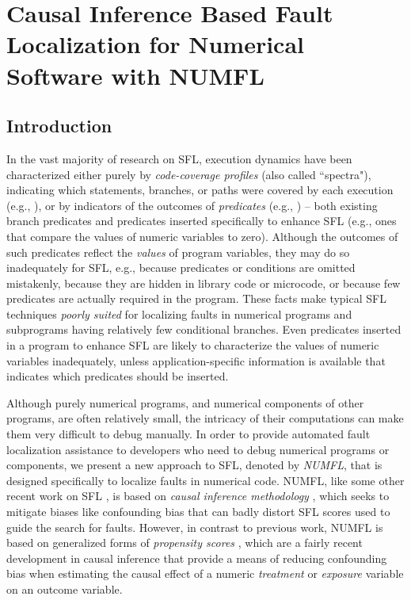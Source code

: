 \chapter{Causal Inference Based Fault Localization for Numerical Software with NUMFL}\label{chap:NUMFL}

\section{Introduction}\label{introduction}
\vspace{-2pt}

In the vast majority of research on SFL, execution dynamics have been characterized either purely by {\it code-coverage profiles} (also called ``spectra"), indicating which statements, branches, or paths were covered by each execution (e.g., \cite{Jones2002}), or by indicators of the outcomes of {\it predicates} (e.g., \cite{Liblit2004}) – both existing branch predicates and predicates inserted specifically to enhance SFL (e.g., ones that compare the values of numeric variables to zero).  Although the outcomes of such predicates reflect the {\it values} of program variables, they may do so inadequately for SFL, e.g., because predicates or conditions are omitted mistakenly, because they are hidden in library code or microcode, or because few predicates are actually required in the program.  These facts make typical SFL techniques {\it poorly suited} for localizing faults in numerical programs and subprograms having relatively few conditional branches.  Even predicates inserted in a program to enhance SFL are likely to characterize the values of numeric variables inadequately, unless application-specific information is available that indicates which predicates should be inserted.

Although purely numerical programs, and numerical components of other programs, are often relatively small, the intricacy of their computations can make them very difficult to debug manually.  In order to provide automated fault localization assistance to developers who need to debug numerical programs or components, we present a new approach to SFL, denoted by {\it NUMFL}, that is designed specifically to localize faults in numerical code.  NUMFL, like some other recent work on SFL \cite{baah2010causal,baah2011mitigating, gore2012reducing,shu2013mfl}, is based on {\it causal inference methodology} \cite{Pearl2003}, which seeks to mitigate biases like confounding bias that can badly distort SFL scores used to guide the search for faults.  However, in contrast to previous work, NUMFL is based on generalized forms of {\it propensity scores} \cite{Imai2004,Imai2014}, which are a fairly recent development in causal inference that provide a means of reducing confounding bias when estimating the causal effect of a numeric {\it treatment} or {\it exposure} variable on an outcome variable.

